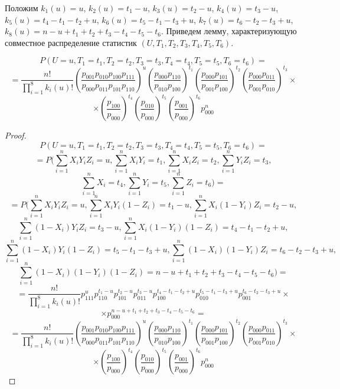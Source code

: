     Положим $k_1(u)=u$, $k_2(u)=t_1-u$, $k_3(u)=t_2-u$, $k_4(u)=t_3-u$, $k_5(u)=t_4-t_1-t_2+u$, $k_6(u)=t_5-t_1-t_3+u$,
    $k_7(u)=t_6 - t_2 - t_3 + u$, $k_8(u)=n-u+t_1+t_2+t_3-t_4-t_5-t_6$. Приведем лемму, характеризующую совместное распределение статистик 
    $(U,T_1,T_2,T_3,T_4,T_5,T_6)$.
    \begin{lemma}\label{joint_distribution}
        $$P(U=u, T_1=t_1, T_2=t_2, T_3=t_3, T_4=t_4, T_5=t_5, T_6=t_6)=$$
        $$=\frac{n!}{\prod_{i=1}^8 k_i(u)!} \left(\dfrac{p_{001}p_{010}p_{100}p_{111}}{p_{000}p_{011}p_{101}p_{110}}\right)^u
            \left(\dfrac{p_{000} p_{110}}{p_{010} p_{100}}\right)^{t_1}\left(\dfrac{p_{000}p_{101}}{p_{001}p_{100}}\right)^{t_2}
            \left(\dfrac{p_{000}p_{011}}{p_{001}p_{010}}\right)^{t_3} \times$$
        $$
            \times \left(\dfrac{p_{100}}{p_{000}}\right)^{t_4}
            \left(\dfrac{p_{010}}{p_{000}}\right)^{t_5} \left(\dfrac{p_{001}}{p_{000}}\right)^{t_6} p_{000}^n
        $$
    \end{lemma}
    \begin{proof}
        $$
            P(U=u, T_1=t_1, T_2=t_2, T_3=t_3, T_4=t_4, T_5=t_5, T_6=t_6)=
        $$
        $$
            =P\biggl(\sum_{i=1}^n X_i Y_i Z_i=u, \sum_{i=1}^n X_i Y_i=t_1, \sum_{i=1}^n X_i Z_i=t_2,\sum_{i=1}^n Y_i Z_i=t_3,
            $$
            $$
            \sum_{i=1}^n X_i=t_4,\sum_{i=1}^n Y_i=t_5, \sum_{i=1}^n Z_i=t_6\biggr)=
        $$
        $$
            =P\biggl(\sum_{i=1}^n X_i Y_i Z_i=u, \sum_{i=1}^n X_i Y_i (1- Z_i)=t_1-u, \sum_{i=1}^n X_i (1-Y_i) Z_i=t_2-u,
        $$
        $$
            \sum_{i=1}^n (1-X_i) Y_i Z_i=t_3-u,
            \sum_{i=1}^{n} X_i(1-Y_i)(1-Z_i)=t_4-t_1-t_2+u,
        $$
        $$
            \sum_{i=1}^{n} (1-X_i)Y_i(1-Z_i)=t_5-t_1-t_3+u,
            \sum_{i=1}^{n} (1-X_i)(1-Y_i)Z_i = t_6 - t_2 - t_3 + u,
        $$
        $$
            \sum_{i=1}^n (1-X_i)(1-Y_i)(1-Z_i)=n-u+t_1+t_2+t_3-t_4-t_5-t_6\biggr)=
        $$
        $$
            = \frac{n!}{\prod_{i=1}^8 k_i(u)!} p_{111}^u p_{110}^{t_1-u} p_{101}^{t_2-u} p_{011}^{t_3-u}
            p_{100}^{t_4-t_1-t_2+u} p_{010}^{t_5-t_1-t_3+u} p_{001}^{t_6 - t_2 - t_3 + u} \times
        $$
        $$
            \times p_{000}^{n-u+t_1+t_2+t_3-t_4-t_5-t_6}
            =
        $$
        $$=\frac{n!}{\prod_{i=1}^8 k_i(u)!} \left(\dfrac{p_{001}p_{010}p_{100}p_{111}}{p_{000}p_{011}p_{101}p_{110}}\right)^u
            \left(\dfrac{p_{000} p_{110}}{p_{010} p_{100}}\right)^{t_1}\left(\dfrac{p_{000}p_{101}}{p_{001}p_{100}}\right)^{t_2}
            \left(\dfrac{p_{000}p_{011}}{p_{001}p_{010}}\right)^{t_3} \times$$
        $$
            \times\left(\dfrac{p_{100}}{p_{000}}\right)^{t_4}
            \left(\dfrac{p_{010}}{p_{000}}\right)^{t_5} \left(\dfrac{p_{001}}{p_{000}}\right)^{t_6} p_{000}^n
        $$
    \end{proof}
